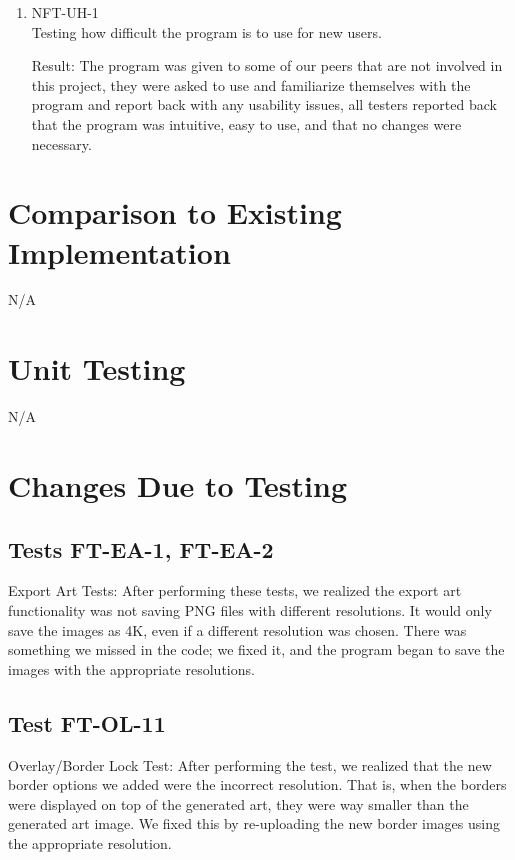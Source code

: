 \documentclass[12pt, titlepage]{article}
\begin{document}
\begin{enumerate}

\item{NFT-UH-1}\\
Testing how difficult the program is to use for new users.

Result: The program was given to some of our peers that are not involved in this project, they were asked to use and familiarize themselves with the program and report back with any usability issues, all testers reported back that the program was intuitive, easy to use, and that no changes were necessary.

\end{enumerate}

\section{Comparison to Existing Implementation}

N/A %

\section{Unit Testing}
N/A

\section{Changes Due to Testing}
\subsection{Tests FT-EA-1, FT-EA-2}
Export Art Tests: After performing these tests, we realized the export art functionality was not saving PNG files with different resolutions. It would only save the images as 4K, even if a different resolution was chosen. There was something we missed in the code; we fixed it, and the program began to save the images with the appropriate resolutions.

\subsection{Test FT-OL-11}
Overlay/Border Lock Test: After performing the test, we realized that the new border options we added were the incorrect resolution. That is, when the borders were displayed on top of the generated art, they were way smaller than the generated art image. We fixed this by re-uploading the new border images using the appropriate resolution.
\end{document}
